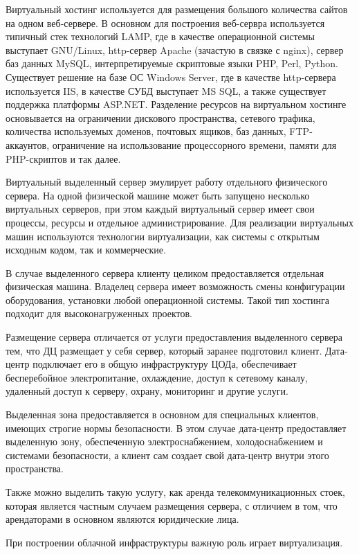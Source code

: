 Виртуальный хостинг используется для размещения большого количества сайтов на одном веб-сервере.
В основном для построения веб-сервра используется типичный стек технологий LAMP, где в качестве операционной системы выступает GNU/Linux, http-сервер Apache (зачастую в связке с nginx), сервер баз данных MySQL, интерпретируемые скриптовые языки PHP, Perl, Python.
Существует решение на базе ОС Windows Server, где в качестве http-сервера используется IIS, в качестве СУБД выступает MS SQL, а также существует поддержка платформы ASP.NET.
Разделение ресурсов на виртуальном хостинге основывается на ограничении дискового пространства, сетевого трафика, количества используемых доменов, почтовых ящиков, баз данных, FTP-аккаунтов, ограничение на использование процессорного времени, памяти для PHP-скриптов и так далее.

Виртуальный выделенный сервер эмулирует работу отдельного физического сервера.
На одной физической машине может быть запущено несколько виртуальных серверов, при этом каждый виртуальный сервер имеет свои процессы, ресурсы и отдельное администрирование.
Для реализации виртуальных машин используются технологии виртуализации, как системы с открытым исходным кодом, так и коммерческие.

В случае выделенного сервера клиенту целиком предоставляется отдельная физическая машина.
Владелец сервера имеет возможность смены конфигурации оборудования, установки любой операционной системы.
Такой тип хостинга подходит для высоконагруженных проектов.

Размещение сервера отличается от услуги предоставления выделенного сервера тем, что ДЦ размещает у себя сервер, который заранее подготовил клиент.
Дата-центр подключает его в общую инфраструктуру ЦОДа, обеспечивает бесперебойное электропитание, охлаждение, доступ к сетевому каналу, удаленный доступ к серверу, охрану, мониторинг и другие услуги.

Выделенная зона предоставляется в основном для специальных клиентов, имеющих строгие нормы безопасности.
В этом случае дата-центр предоставляет выделенную зону, обеспеченную электроснабжением, холодоснабжением и системами безопасности, а клиент сам создает свой дата-центр внутри этого пространства.

Также можно выделить такую услугу, как аренда телекоммуникационных стоек, которая является частным случаем размещения сервера, с отличием в том, что арендаторами в основном являются юридические лица.

При построении облачной инфраструктуры важную роль играет виртуализация.

